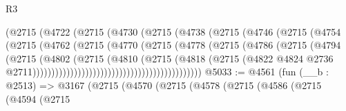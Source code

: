 \begin{lexlean}{R3}
\begin{coremodule}
                                      (@2715
                                        (@4722
                                          (@2715
                                            (@4730
                                              (@2715
                                                (@4738
                                                  (@2715
                                                    (@4746
                                                      (@2715
                                                        (@4754
                                                          (@2715
                                                            (@4762
                                                              (@2715
                                                                (@4770
                                                                  (@2715
                                                                    (@4778
                                                                      (@2715
                                                                        (@4786
                                                                          (@2715
                                                                            (@4794
                                                                              (@2715
                                                                                (@4802
                                                                                  (@2715
                                                                                    (@4810
                                                                                      (@2715
                                                                                        (@4818
                                                                                          (@2715
                                                                                            (@4822
                                                                                              @4824
                                                                                              @2736
                                                                                              @2711)))))))))))))))))))))))))))))))))))))))))))))
@5033 := @4561
    (fun (__b : @2513) =>
    @3167
      (@2715
        (@4570
          (@2715
            (@4578
              (@2715
                (@4586
                  (@2715
                    (@4594
                      (@2715

\end{coremodule}
\end{lexlean}
